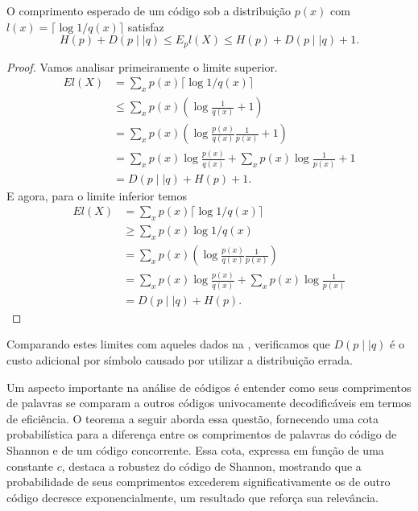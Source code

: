 \begin{theorem}
O comprimento esperado de um código sob a distribuição $p(x)$ com $l(x) = \lceil \log 1/q(x) \rceil$ satisfaz
\begin{equation}
  H(p) + D(p \mid \mid q) \leq E_p l(X) \leq H(p) + D(p \mid \mid q) + 1 .
\end{equation}
\end{theorem}
\begin{proof}
Vamos analisar primeiramente o limite superior.  
\begin{subequations}
  \begin{align}
    E l(X) &= \sum_x p(x) \lceil \log 1/q(x) \rceil \\
           &\leq \sum_x p(x) \left( \log \frac{1}{q(x)} + 1 \right) \\
           &= \sum_x p(x) \left( \log \frac{p(x)}{q(x)} \frac{1}{p(x)} + 1 \right) \\
           &= \sum_x p(x) \log \frac{p(x)}{q(x)} + \sum_x p(x) \log \frac{1}{p(x)} + 1 \\
           &= D(p \mid \mid q) + H(p) + 1 .
  \end{align}
\end{subequations}
E agora, para o limite inferior temos
\begin{subequations}
  \begin{align}
    E l(X) &= \sum_x p(x) \lceil \log 1/q(x) \rceil \\
           &\geq \sum_x p(x) \log 1/q(x) \\
           &= \sum_x p(x) \left( \log \frac{p(x)}{q(x)} \frac{1}{p(x)}\right) \\
           &= \sum_x p(x) \log \frac{p(x)}{q(x)} + \sum_x p(x) \log \frac{1}{p(x)} \\
           &= D(p \mid \mid q) + H(p) .
  \end{align}
\end{subequations}
\end{proof}
Comparando estes limites com aqueles dados na , verificamos que
$D(p \mid \mid q)$ é o custo adicional por símbolo causado por utilizar a distribuição errada.



Um aspecto importante na análise de códigos é entender como seus comprimentos
de palavras se comparam a outros códigos univocamente decodificáveis em termos
de eficiência. O teorema a seguir aborda essa questão, fornecendo uma cota
probabilística para a diferença entre os comprimentos de palavras do código de
Shannon e de um código concorrente. Essa cota, expressa em função de uma
constante $c$, destaca a robustez do código de Shannon, mostrando que a
probabilidade de seus comprimentos excederem significativamente os de outro
código decresce exponencialmente, um resultado que reforça sua relevância.

